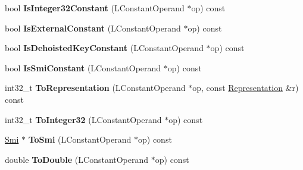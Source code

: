 \begin{DoxyCompactItemize}
\item 
bool {\bfseries Is\+Integer32\+Constant} (L\+Constant\+Operand $\ast$op) const \hypertarget{classv8_1_1internal_1_1_l_code_gen_a5881f4e22804c55738fa9243f04a9a6e}{}\label{classv8_1_1internal_1_1_l_code_gen_a5881f4e22804c55738fa9243f04a9a6e}

\item 
bool {\bfseries Is\+External\+Constant} (L\+Constant\+Operand $\ast$op) const \hypertarget{classv8_1_1internal_1_1_l_code_gen_aa6a77a50de1798eafced05e8b7fa6c9d}{}\label{classv8_1_1internal_1_1_l_code_gen_aa6a77a50de1798eafced05e8b7fa6c9d}

\item 
bool {\bfseries Is\+Dehoisted\+Key\+Constant} (L\+Constant\+Operand $\ast$op) const \hypertarget{classv8_1_1internal_1_1_l_code_gen_a832c02863ded0d865a67c76676466c3f}{}\label{classv8_1_1internal_1_1_l_code_gen_a832c02863ded0d865a67c76676466c3f}

\item 
bool {\bfseries Is\+Smi\+Constant} (L\+Constant\+Operand $\ast$op) const \hypertarget{classv8_1_1internal_1_1_l_code_gen_ae49e700ae64a41fad78b1ca100986c98}{}\label{classv8_1_1internal_1_1_l_code_gen_ae49e700ae64a41fad78b1ca100986c98}

\item 
int32\+\_\+t {\bfseries To\+Representation} (L\+Constant\+Operand $\ast$op, const \hyperlink{classv8_1_1internal_1_1_representation}{Representation} \&r) const \hypertarget{classv8_1_1internal_1_1_l_code_gen_a0e99f5084c7765aa53aa0537c112b4f1}{}\label{classv8_1_1internal_1_1_l_code_gen_a0e99f5084c7765aa53aa0537c112b4f1}

\item 
int32\+\_\+t {\bfseries To\+Integer32} (L\+Constant\+Operand $\ast$op) const \hypertarget{classv8_1_1internal_1_1_l_code_gen_a477ff533f07d93b0e1ca5f9290beea36}{}\label{classv8_1_1internal_1_1_l_code_gen_a477ff533f07d93b0e1ca5f9290beea36}

\item 
\hyperlink{classv8_1_1internal_1_1_smi}{Smi} $\ast$ {\bfseries To\+Smi} (L\+Constant\+Operand $\ast$op) const \hypertarget{classv8_1_1internal_1_1_l_code_gen_a9aa0394d9bdd7a07b4190d08edb0a8e6}{}\label{classv8_1_1internal_1_1_l_code_gen_a9aa0394d9bdd7a07b4190d08edb0a8e6}

\item 
double {\bfseries To\+Double} (L\+Constant\+Operand $\ast$op) const \hypertarget{classv8_1_1internal_1_1_l_code_gen_a9859cf602181324ec10970ab93416aaa}{}\label{classv8_1_1internal_1_1_l_code_gen_a9859cf602181324ec10970ab93416aaa}


\end{DoxyCompactItemize}
